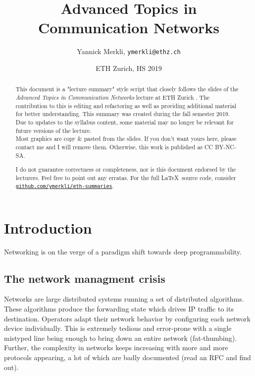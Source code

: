 \documentclass[11pt,oneside,a4paper]{article}
\title{Advanced Topics in Communication Networks}
\author{Yannick Merkli, \texttt{ymerkli@ethz.ch}}
\date{ETH Zurich, HS 2019}
\begin{document}
	
\begin{titlepage}
\maketitle
\vspace{3cm}
\thispagestyle{empty}


\begin{abstract}
	\noindent This document is a "lecture summary" style script that closely follows the slides of the \textit{Advanced Topics in Communication Networks} lecture  at ETH Zurich \cite{advnet}. The contribution to this is editing and refactoring as well as providing additional material for better understanding. This summary was created during the fall semester 2019. Due to updates to the syllabus content, some material may no longer be relevant for future versions of the lecture.\\
	Most graphics are copy \& pasted from the slides. If you don't want yours here, please contact me and I will remove them. Otherwise, this work is published as CC BY-NC-SA.
	
	\begin{center}
		\ccbyncsa
	\end{center}
	
	\noindent I do not guarantee correctness or completeness, nor is this document endorsed by the lecturers. Feel free to point out any erratas. For the full \LaTeX \ source code, consider \texttt{\href{https://github.com/ymerkli/eth-summaries}{github.com/ymerkli/eth-summaries}}.
\end{abstract}

\end{titlepage}

\maketitle
\thispagestyle{empty}
\raggedbottom
\clearpage


\clearpage
\setcounter{tocdepth}{2}
\tableofcontents
\clearpage
{}

\section{Introduction}

Networking is on the verge of a paradigm shift towards deep programmability.

\subsection{The network managment crisis}
Networks are large distributed systems running a set of distributed algorithms. These algorithms produce the forwarding state which drives IP traffic to its destination. Operators adapt their network behavior by configuring each network device individually. This is extremely tedious and error-prone with a single mistyped line being enough to bring down an entire network (fat-thumbing). Further, the complexity in networks keeps increasing with more and more protocols appearing, a lot of which are badly documented (read an RFC and find out).
\end{document}
